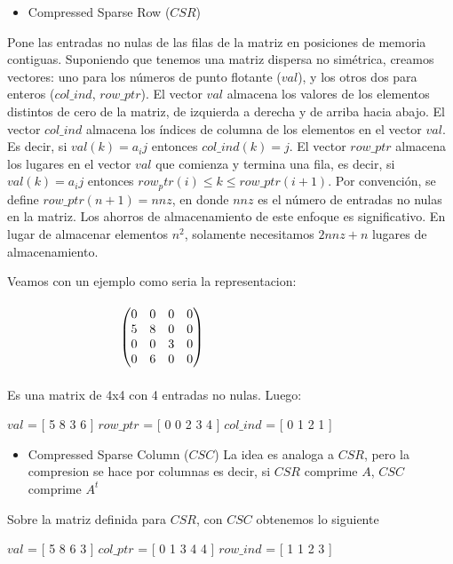 \begin{itemize}
\item Compressed Sparse Row ($CSR$)
\end{itemize}
Pone las entradas no nulas de las filas de la matriz en posiciones de memoria contiguas. Suponiendo que tenemos una matriz dispersa no simétrica, creamos vectores: uno para los números de punto flotante ($val$), y los otros dos para enteros ($col\_ind$, $row\_ptr$). El vector $val$ almacena los valores de los elementos distintos de cero de la matriz, de izquierda a derecha y de arriba hacia abajo. El vector $col\_ind$ almacena los índices de columna de los elementos en el vector $val$. Es decir, si $val(k) = a_ij$ entonces $col\_ind(k) = j$. El vector $row\_ptr$ almacena los lugares en el vector $val$ que comienza y termina una fila, es decir, si $val(k) = a_ij$ entonces $row_ptr(i) \leq k \leq row\_ptr(i+1)$. Por convención, se define $row\_ptr(n+1) = nnz$, en donde $nnz$ es el número de entradas no nulas en la matriz. Los ahorros de almacenamiento de este enfoque es significativo. En lugar de almacenar elementos $n^2$, solamente necesitamos $2nnz + n$ lugares de almacenamiento.

Veamos con un ejemplo como seria la representacion:
\\\\


$\hspace{3.2cm}\begin{pmatrix} 0 & 0 & 0 & 0 \\ 5 & 8 & 0 & 0 \\ 0 & 0 & 3 & 0 \\ 0 & 6 & 0 & 0 \\ \end{pmatrix}$
\\\\
Es una matrix de 4x4 con 4 entradas no nulas. Luego:

   $val$  = [ 5 8 3 6 ]
   $row\_ptr$ = [ 0 0 2 3 4 ]
   $col\_ind$ = [ 0 1 2 1 ]
   

\begin{itemize}
\item Compressed Sparse Column ($CSC$)
La idea es analoga a $CSR$, pero la compresion se hace por columnas es decir, si $CSR$ comprime $A$, $CSC$ comprime $A^t$  
\end{itemize}


Sobre la matriz definida para $CSR$, con $CSC$ obtenemos lo siguiente


   $val$  = [ 5 8 6 3 ]
   $col\_ptr$ = [ 0 1 3 4 4 ]   
   $row\_ind$ = [ 1 1 2 3 ]


